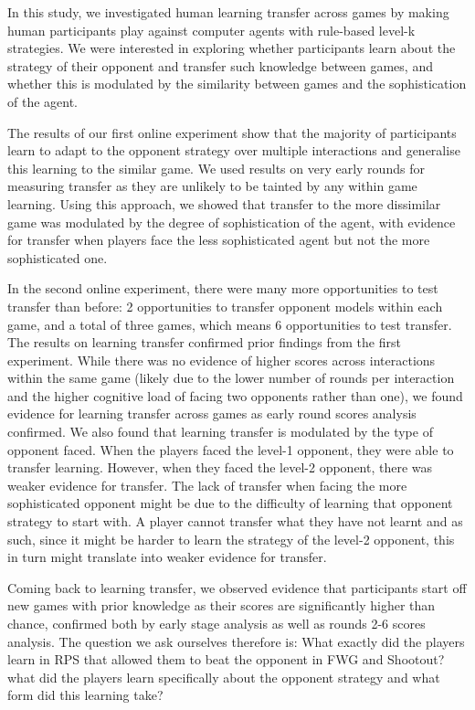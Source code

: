 \documentclass[man,floatsintext]{apa6}
\begin{document}
In this study, we investigated human learning transfer across games by making human participants play against computer agents with rule-based level-k strategies. We were interested in exploring whether participants learn about the strategy of their opponent and transfer such knowledge between games, and whether this is modulated by the similarity between games and the sophistication of the agent.

The results of our first online experiment show that the majority of participants learn to adapt to the opponent strategy over multiple interactions and generalise this learning to the similar game. We used results on very early rounds for measuring transfer as they are unlikely to be tainted by any within game learning. Using this approach, we showed that transfer to the more dissimilar game was modulated by the degree of sophistication of the agent, with evidence for transfer when players face the less sophisticated agent but not the more sophisticated one.

In the second online experiment, there were many more opportunities to test transfer than before: 2 opportunities to transfer opponent models within each game, and a total of three games, which means 6 opportunities to test transfer. The results on learning transfer confirmed prior findings from the first experiment. While there was no evidence of higher scores across interactions within the same game (likely due to the lower number of rounds per interaction and the higher cognitive load of facing two opponents rather than one), we found evidence for learning transfer across games as early round scores analysis confirmed. We also found that learning transfer is modulated by the type of opponent faced. When the players faced the level-1 opponent, they were able to transfer learning. However, when they faced the level-2 opponent, there was weaker evidence for transfer. The lack of transfer when facing the more sophisticated opponent might be due to the difficulty of learning that opponent strategy to start with. A player cannot transfer what they have not learnt and as such, since it might be harder to learn the strategy of the level-2 opponent, this in turn might translate into weaker evidence for transfer.

Coming back to learning transfer, we observed evidence that participants start off new games with prior knowledge as their scores are significantly higher than chance, confirmed both by early stage analysis as well as rounds 2-6 scores analysis. The question we ask ourselves therefore is: What exactly did the players learn in RPS that allowed them to beat the opponent in FWG and Shootout? what did the players learn specifically about the opponent strategy and what form did this learning take?
\end{document}

